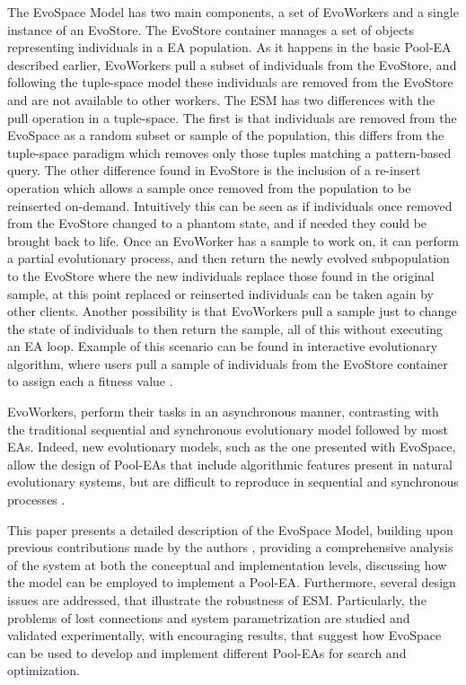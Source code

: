 The EvoSpace Model has two main components, a set of EvoWorkers and a single instance of an EvoStore. The EvoStore container manages a set of objects representing individuals in a EA population. As it happens in the basic Pool-EA described earlier, EvoWorkers pull a subset of individuals from the EvoStore, and following the tuple-space model these individuals are removed from the EvoStore and are not available to other workers. The ESM has two differences with the pull operation in a tuple-space. The first is that individuals are removed from the EvoSpace as a random subset or sample of the population, this differs from the tuple-space paradigm which removes only those tuples matching a pattern-based query. The other difference found in EvoStore is the inclusion of a re-insert operation which allows a sample once removed from the population to be reinserted on-demand. Intuitively this can be seen as if individuals once removed from the EvoStore changed to a phantom state, and if needed they could be brought back to life. Once an EvoWorker has a sample to work on, it can perform a partial evolutionary process, and then return the newly evolved subpopulation to the EvoStore where the new individuals replace  those found in the original sample, at this point replaced or reinserted individuals can be taken again by other clients. Another possibility is that  EvoWorkers pull a sample just to change the state of individuals to then return the sample, all of this without executing an EA loop. Example of this scenario can be found in interactive evolutionary algorithm, where users pull a sample of individuals from the EvoStore container to assign each a fitness value  \cite{Musart,Fire}.  

EvoWorkers, perform their tasks in an asynchronous manner, contrasting with the traditional sequential and synchronous evolutionary model followed by most EAs. Indeed, new evolutionary models, such as the one presented with EvoSpace, allow the design of Pool-EAs that include algorithmic features present in natural evolutionary systems, but are difficult to reproduce in sequential and synchronous processes \cite{eiben}.

This paper presents a detailed description of the EvoSpace Model, building upon previous contributions made by the authors \cite{Evospace,FreeLunch},
providing a comprehensive analysis of the system at both the
conceptual and implementation levels, %
discussing how the model can be
employed to implement a Pool-EA.
Furthermore, several design issues are addressed, that illustrate the robustness of ESM.
Particularly, the problems of lost connections and system parametrization are studied and validated experimentally, with
encouraging results, that suggest how EvoSpace can be used to develop and implement different Pool-EAs for search and optimization.

